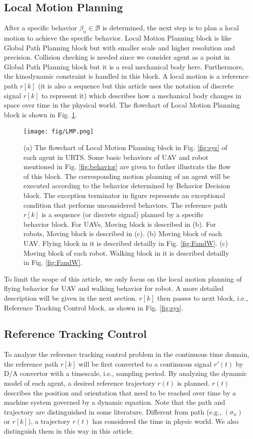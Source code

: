 \documentclass[journal,12pt,onecolumn,draftclsnofoot,]{IEEEtran}
\begin{document}
\subsection{Local Motion Planning}
After a specific behavior $\beta_n\in\mathcal{B}$ is determined, the next step is to plan a local motion to achieve the specific behavior. Local Motion Planning block is like Global Path Planning block but with smaller scale and higher resolution and precision. Collision checking is needed since we consider agent as a point in Global Path Planning block but it is a real mechanical body here. Furthermore, the kinodynamic constraint is handled in this block. A local motion is a reference path $r[k]$ (it is also a sequence but this article uses the notation of discrete signal $r[k]$ to represent it) which describes how a mechanical body changes in space over time in the physical world. The flowchart of Local Motion Planning block is shown in Fig. \ref{fig:LMP}.
\begin{figure}[htbp]
    \centering
    \texttt{[image: fig/LMP.png]}\caption{
        (a) The flowchart of Local Motion Planning block in Fig. \ref{fig:sys} of each agent in URTS. Some basic behaviors of UAV and robot mentioned in Fig. \ref{fig:behavior} are given to futher illustrate the flow of this block. The corresponding motion planning of an agent will be executed according to the behavior determined by Behavior Decision block. The exception terminator in figure represents an exceptional condition that performs unconsidered behaviors. The reference path $r[k]$ is a sequence (or discrete signal) planned by a specific behavior block. For UAVs, Moving block is described in (b). For robots, Moving block is described in (c). 
        (b) Moving block of each UAV. Flying block in it is described detailly in Fig. \ref{fig:FandW}. 
        (c) Moving block of each robot. Walking block in it is described detailly in Fig. \ref{fig:FandW}.}
    \label{fig:LMP}
\end{figure}

To limit the scope of this article, we only focus on the local motion planning of flying behavior for UAV and walking behavior for robot. A more detailed description will be given in the next section. $r[k]$ then passes to next block, i.e., Reference Tracking Control block, as shown in Fig. \ref{fig:sys}.

\subsection{Reference Tracking Control}
To analyze the reference tracking control problem in the continuous time domain, the reference path $r[k]$ will be first converted to a continuous signal $r'(t)$ by D/A convertor with a timescale, i.e., sampling period. By analyzing the dynamic model of each agent, a desired reference trajectory $r(t)$ is planned. $r(t)$ describes the position and orientation that need to be reached over time by a machine system governed by a dynamic equation. Note that the path and trajectory are distinguished in some literature. Different from path (e.g., $(\sigma_n)$ or $r[k]$), a trajectory $r(t)$ has considered the time in physic world. We also distinguish them in this way in this article.
\end{document}

